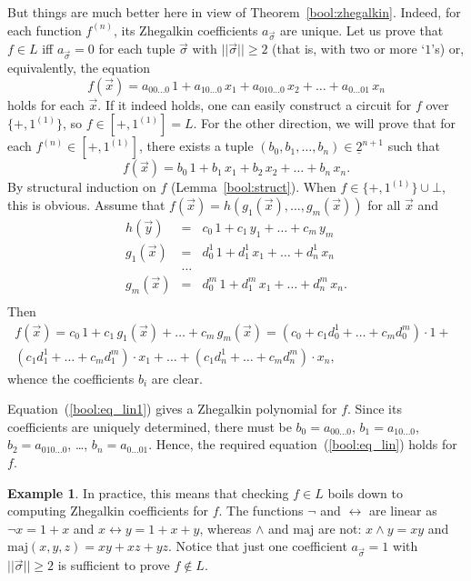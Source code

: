 \documentclass[12pt,notitlepage]{article}
\theoremstyle{plain}
\theoremstyle{definition}
\newtheorem{exm}[thm]{Example}
\theoremstyle{plain}
\newcommand{\ul}[1]{\underline{#1}}
\newcommand{\1}{\mathbf{1}}
\newcommand{\0}{\mathbf{0}}
\begin{document}
But things are much better here in view of Theorem~\ref{bool:zhegalkin}. Indeed, for each function $f^{(n)}$, its Zhegalkin coefficients $a_{\vec\sigma}$ are unique. Let us prove that $f \in L$ iff $a_{\vec\sigma} = 0$ for each tuple $\vec\sigma$ with $||\vec\sigma|| \geq 2$ (that is, with two or more `$1$'s) or, equivalently, the equation
\begin{equation}\label{bool:eq_lin}
f(\vec x) = a_{00\ldots0}\, 1 + a_{10\ldots0}\, x_1 + a_{010\ldots0}\, x_2 + \ldots + a_{0\ldots01}\, x_n
\end{equation}
holds for each $\vec x$. If it indeed holds, one can easily construct a circuit for $f$ over $\{{+}, 1^{(1)}\}$, so $f \in [{+}, 1^{(1)}] = L$. For the other direction, we will prove that for each $f^{(n)} \in [{+}, 1^{(1)}]$, there exists a tuple $(b_0, b_1, \ldots, b_n) \in \ul{2}^{n + 1}$  such that
\begin{equation}\label{bool:eq_lin1}
f(\vec x) = b_0\, 1 + b_1\, x_1 + b_2\, x_2 + \ldots + b_n\, x_n.
\end{equation}
By structural induction on $f$ (Lemma~\ref{bool:struct}). When $f \in \{{+}, 1^{(1)}\} \cup \bot$, this is obvious. Assume that $f(\vec x) = h(g_1(\vec x),\ldots, g_m(\vec x))$ for all $\vec x$ and
$$
\begin{array}{rcl}
h(\vec y) &=& c_0\, 1 + c_1\, y_1 + \ldots + c_m\, y_m\\
g_1(\vec x) &=& d^1_0\, 1 + d^1_1\, x_1 + \ldots + d^1_n\, x_n\\ 
&\ldots&\\
g_m(\vec x) &=& d^m_0\, 1 + d^m_1\, x_1 + \ldots + d^m_n\, x_n.\\ 
\end{array}
$$
Then
\begin{multline*}
f(\vec x) = c_0\, 1 + c_1\, g_1(\vec x) + \ldots + c_m\, g_m(\vec x) = (c_0 + c_1 d^1_0 + \ldots + c_m d^m_0) \cdot 1 +\phantom{1}\\
 (c_1 d^1_1 + \ldots + c_m d^m_1) \cdot x_1 + \ldots + (c_1 d^1_n + \ldots + c_m d^m_n) \cdot x_n,
\end{multline*}
whence the coefficients $b_i$ are clear.

Equation~(\ref{bool:eq_lin1}) gives a Zhegalkin polynomial for $f$. Since its coefficients are uniquely determined, there must be $b_0 = a_{00\ldots0}$, $b_1 = a_{10\ldots0}$, $b_2 = a_{010\ldots0}$, \dots, $b_n = a_{0\ldots01}$. Hence, the required equation~(\ref{bool:eq_lin}) holds for $f$.

\begin{exm}
In practice, this means that checking $f \in L$ boils down to computing Zhegalkin coefficients for $f$. The functions $\neg$ and $\leftrightarrow$ are linear as $\neg x = 1 + x$ and $x \leftrightarrow y = 1 + x + y$, whereas $\wedge$ and $\mathrm{maj}$ are not: $x \wedge y = x y$ and $\mathrm{maj}(x,y,z) = xy + xz + yz$. Notice that just one coefficient $a_{\vec\sigma} = 1$ with $||\vec\sigma|| \geq 2$ is sufficient to prove $f \notin L$.
\end{exm}
\end{document}
